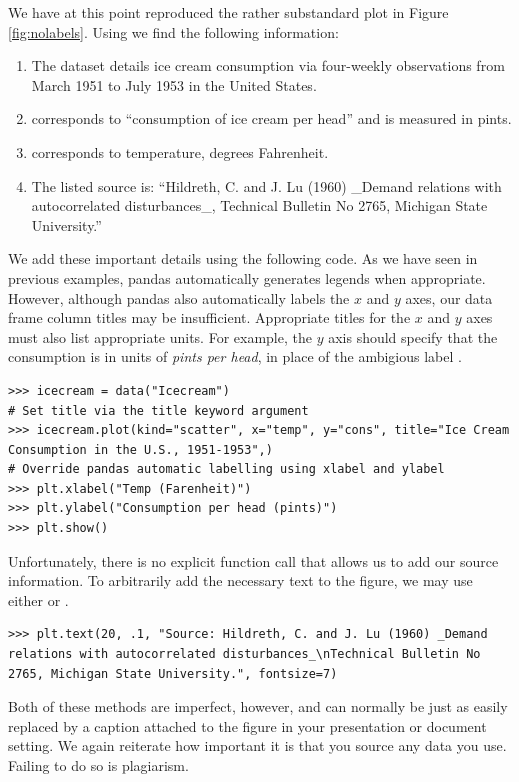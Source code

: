 We have at this point reproduced the rather substandard plot in Figure \ref{fig:nolabels}.
Using  we find the following information:
\begin{enumerate}
    \item The dataset details ice cream consumption via four-weekly observations from March 1951 to July 1953 in the United States.
    \item {} corresponds to ``consumption of ice cream per head'' and is measured in pints.
    \item {} corresponds to temperature, degrees Fahrenheit.
    \item The listed source is: ``Hildreth, C. and J. Lu (1960) \_Demand relations with autocorrelated disturbances\_, Technical Bulletin No 2765, Michigan State University.''
\end{enumerate}

We add these important details using the following code.
As we have seen in previous examples, pandas automatically generates legends when appropriate.
However, although pandas also automatically labels the $x$ and $y$ axes, our data frame column titles may be insufficient.
Appropriate titles for the $x$ and $y$ axes must also list appropriate units. 
For example, the $y$ axis should specify that the consumption is in units of \emph{pints per head}, in place of the ambigious label .
\begin{lstlisting}
>>> icecream = data("Icecream")
# Set title via the title keyword argument
>>> icecream.plot(kind="scatter", x="temp", y="cons", title="Ice Cream Consumption in the U.S., 1951-1953",)
# Override pandas automatic labelling using xlabel and ylabel
>>> plt.xlabel("Temp (Farenheit)")
>>> plt.ylabel("Consumption per head (pints)")
>>> plt.show()
\end{lstlisting}

Unfortunately, there is no explicit function call that allows us to add our source information.
To arbitrarily add the necessary text to the figure, we may use either  or . 
\begin{lstlisting}
>>> plt.text(20, .1, "Source: Hildreth, C. and J. Lu (1960) _Demand relations with autocorrelated disturbances_\nTechnical Bulletin No 2765, Michigan State University.", fontsize=7)
\end{lstlisting}
Both of these methods are imperfect, however, and can normally be just as easily replaced by a caption attached to the figure in your presentation or document setting. 
We again reiterate how important it is that you source any data you use. Failing to do so is plagiarism.

